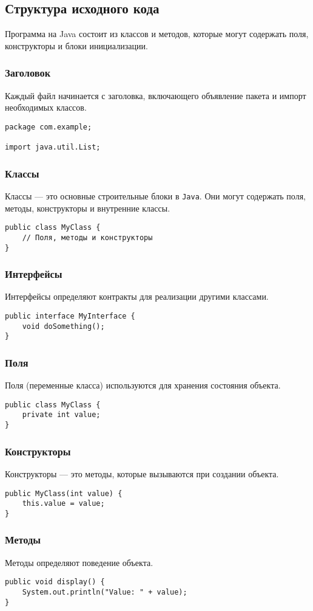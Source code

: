 \subsection{Структура исходного кода}
Программа на Java состоит из классов и методов, которые могут содержать поля, конструкторы и блоки инициализации.

\subsubsection{Заголовок}
Каждый файл начинается с заголовка, включающего объявление пакета и импорт необходимых классов.
\begin{verbatim}
package com.example;

import java.util.List;
\end{verbatim}

\subsubsection{Классы}
Классы — это основные строительные блоки в \texttt{Java}. Они могут содержать поля, методы, конструкторы и внутренние классы.
\begin{verbatim}
public class MyClass {
    // Поля, методы и конструкторы
}
\end{verbatim}

\subsubsection{Интерфейсы}
Интерфейсы определяют контракты для реализации другими классами.
\begin{verbatim}
public interface MyInterface {
    void doSomething();
}
\end{verbatim}

\subsubsection{Поля}
Поля (переменные класса) используются для хранения состояния объекта.
\begin{verbatim}
public class MyClass {
    private int value;
}
\end{verbatim}

\subsubsection{Конструкторы}
Конструкторы — это методы, которые вызываются при создании объекта.
\begin{verbatim}
public MyClass(int value) {
    this.value = value;
}
\end{verbatim}

\subsubsection{Методы}
Методы определяют поведение объекта.
\begin{verbatim}
public void display() {
    System.out.println("Value: " + value);
}
\end{verbatim}
